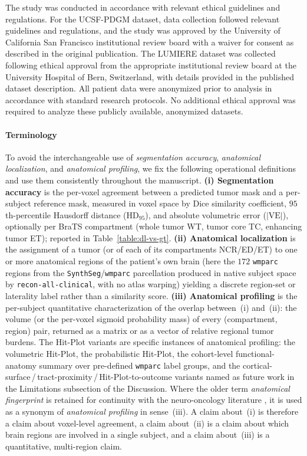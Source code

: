 \documentclass[a4paper,11pt,leqno]{article}
\begin{document}
The study was conducted in accordance with relevant ethical guidelines and regulations. For the UCSF-PDGM dataset, data collection followed relevant guidelines and regulations, and the study was approved by the University of California San Francisco institutional review board with a waiver for consent as described in the original publication. The LUMIERE dataset was collected following ethical approval from the appropriate institutional review board at the University Hospital of Bern, Switzerland, with details provided in the published dataset description. All patient data were anonymized prior to analysis in accordance with standard research protocols. No additional ethical approval was required to analyze these publicly available, anonymized datasets.

\paragraph{Terminology}

To avoid the interchangeable use of \emph{segmentation accuracy},
\emph{anatomical localization}, and \emph{anatomical profiling}, we
fix the following operational definitions and use them consistently
throughout the manuscript.
\textbf{(i) Segmentation accuracy} is the per-voxel agreement between
a predicted tumor mask and a per-subject reference mask, measured in
voxel space by Dice similarity coefficient, $95$th-percentile
Hausdorff distance (HD$_{95}$), and absolute volumetric error
($|\mathrm{VE}|$), optionally per BraTS compartment (whole tumor WT,
tumor core TC, enhancing tumor ET); reported in
Table~\ref{table:dl-vs-gt}.
\textbf{(ii) Anatomical localization} is the assignment of a tumor
(or of each of its compartments NCR/ED/ET) to one or more anatomical
regions of the patient's own brain (here the $172$ \texttt{wmparc}
regions from the \texttt{SynthSeg}/\texttt{wmparc} parcellation produced in native
subject space by \texttt{recon-all-clinical}, with no atlas warping) yielding a discrete region-set or laterality label rather than a
similarity score.
\textbf{(iii) Anatomical profiling} is the per-subject quantitative
characterization of the overlap between~(i) and~(ii): the volume (or
the per-voxel sigmoid probability mass) of every (compartment, region) pair,
returned as a matrix or as a vector of relative regional tumor
burdens. The Hit-Plot variants are specific instances of anatomical profiling:
the volumetric Hit-Plot, the
probabilistic Hit-Plot, the cohort-level functional-anatomy summary
over pre-defined \texttt{wmparc} label groups, and the
cortical-surface\,/\,tract-proximity\,/\,Hit-Plot-to-outcome variants
named as future work in the Limitations subsection of the Discussion. Where the older term
\emph{anatomical
fingerprint} is retained for continuity with the neuro-oncology
literature \cite{DeLuca2022}, it is used as a synonym of
\emph{anatomical profiling} in sense~(iii).
A claim about~(i) is therefore a claim about voxel-level agreement,
a claim about~(ii) is a claim about which brain regions are involved
in a single subject, and a claim about~(iii) is a quantitative,
multi-region claim.
\end{document}
